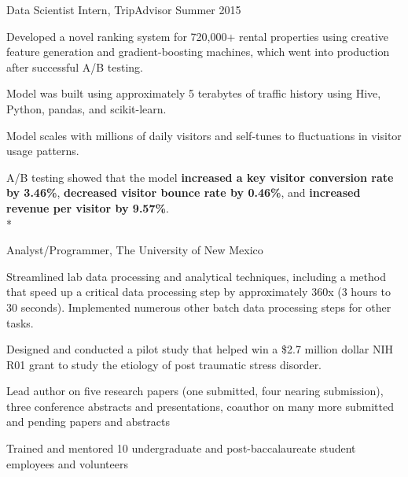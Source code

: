 \documentclass[print]{friggeri-cv} %
\begin{document}
\begin{description} \itemsep1pt \parskip0pt 
  \item {\largeheaderfont Data Scientist Intern, TripAdvisor } \hfill
    {\smallheaderfont Summer 2015}
    \begin{myitemize} \itemsep1pt \parskip1pt 
      \item Developed a novel ranking system for
            720,000+ rental properties using creative feature generation and
            gradient-boosting machines, which went into production after
            successful A/B testing.
      \item Model was built using approximately 5 terabytes of traffic
            history using Hive, Python, pandas, and scikit-learn.
      \item Model scales with millions of daily visitors and self-tunes to
            fluctuations in visitor usage patterns.
      \item A/B testing showed that the model \textbf{increased a key visitor conversion
            rate by 3.46\%}, \textbf{decreased visitor bounce rate by 0.46\%},
            and \textbf{increased revenue per visitor by 9.57\%}.\\*
    \end{myitemize}

  \item {\largeheaderfont Analyst/Programmer, The University of New Mexico} \hfill 
    { }
    \begin{myitemize} \itemsep0.5pt \parskip0pt 
      \item Streamlined lab data processing and analytical techniques, including a
        method that speed up a critical data processing step by approximately 360x
        (3 hours to 30 seconds). Implemented numerous other batch data processing
        steps for other tasks.
      \item Designed and conducted a pilot study that helped win a \$2.7 million
        dollar NIH R01 grant to study the etiology of post traumatic stress
        disorder.
      \item Lead author on five research papers (one submitted, four nearing
        submission), three conference abstracts and presentations, coauthor on many
        more submitted and pending papers and abstracts
      \item Trained and mentored 10 undergraduate and post-baccalaureate student
        employees and volunteers
    \end{myitemize}


\end{description}
\end{document}
